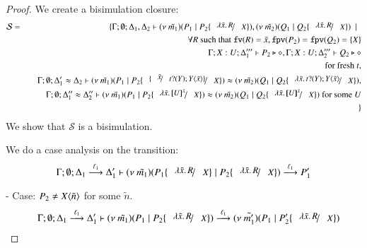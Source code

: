 \begin{proof}
	We create a bisimulation closure:
%
	\begin{eqnarray*}
		\mathcal{S} &=&
			\set{\horel{\Gamma}{\Delta_1}{\newsp{\tilde{m_1}}{P_1 \Par P_2 \subst{\abs{\tilde{x}}{R}}{X}}}{,}
			{\Delta_2}{\newsp{\tilde{m_2}}{Q_1 \Par Q_2 \subst{\abs{\tilde{x}}{R}}{X}}} \setbar \\
			&& \quad \forall R \textrm{ such that } \fv{R} = \tilde{x}, \fpv{P_2} = \fpv{Q_2} = \set{X}\\
			&& \quad \Gamma; X: U; \Delta_1''' \proves P_2 \hastype \Proc, \Gamma; X: U; \Delta_2''' \proves Q_2 \hastype \Proc\\
			&& \quad \textrm{for fresh } t,\\
			&& \quad \horel{\Gamma}{\Delta_1'}{\newsp{\tilde{m_1}}{P_1 \Par P_2 \subst{\subst{\tilde{x}}{\binp{t}{Y} \appl{Y}{\tilde{x}}}}{X}}}{\wb}{\Delta_2}{\newsp{\tilde{m_2}}{Q_1 \Par Q_2 \subst{\abs{\tilde{x}}{\binp{t}{Y} \appl{Y}{\tilde{x}}}}{X}}},\\
			&& \quad \horel{\Gamma}{\Delta_1''}{\newsp{\tilde{m_1}}{P_1 \Par P_2 \subst{\abs{\tilde{x}}{\map{U}^{\tilde{x}}}}{X}}}{\wb}{\Delta_2''}{\newsp{\tilde{m_2}}{Q_1 \Par Q_2 \subst{\abs{\tilde{x}}{\map{U}^{\tilde{x}}}}{X}} \textrm{ for some } U}\\
			&&}
	\end{eqnarray*}
%
	\noi  We show that $\mathcal{S}$ is a bisimulation.

	\noi We do a case analysis on the transition:
%
	\[
		\horel{\Gamma}{\Delta_1}{\newsp{\tilde{m_1}}{P_1 \subst{\abs{\tilde{x}}{R}}{X} \Par P_2\subst{\abs{\tilde{x}}{R}}{X} }}{\by{\ell_1}}{\Delta_1'}{P_1'}
	\]
%

	\noi - Case: $P_2 \not= X\langle \tilde{n} \rangle$ for some $\tilde{n}$.
%
	\begin{eqnarray*}
		&&	\horel{\Gamma}{\Delta_1}
			{\newsp{\tilde{m_1}}{P_1 \Par P_2 \subst{\abs{\tilde{x}}{R}}{X} }}
			{\by{\ell_1}}
			{\Delta_1'}{\newsp{\tilde{m_1'}}{P_1 \Par P_2' \subst{\abs{\tilde{x}}{R}}{X}}}
	\end{eqnarray*}


\end{proof}
